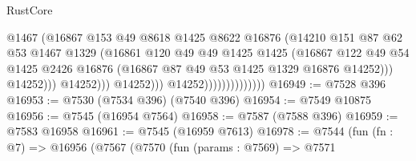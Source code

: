 \begin{lexlean}{RustCore}
\begin{coremodule}
                                              @1467
                                              (@16867
                                                @153
                                                @49
                                                @8618
                                                @1425
                                                @8622
                                                @16876
                                                (@14210
                                                  @151
                                                  @87
                                                  @62
                                                  @53
                                                  @1467
                                                  @1329
                                                  (@16861
                                                    @120
                                                    @49
                                                    @49
                                                    @1425
                                                    @1425
                                                    (@16867
                                                      @122
                                                      @49
                                                      @54
                                                      @1425
                                                      @2426
                                                      @16876
                                                      (@16867
                                                        @87
                                                        @49
                                                        @53
                                                        @1425
                                                        @1329
                                                        @16876
                                                        @14252)))
                                                  @14252)))
                                            @14252)))
                                      @14252)))
                                @14252))))))))))))))
@16949 := @7528 @396
@16953 := @7530 (@7534 @396) (@7540 @396)
@16954 := @7549 @10875
@16956 := @7545 (@16954 @7564)
@16958 := @7587 (@7588 @396)
@16959 := @7583 @16958
@16961 := @7545 (@16959 @7613)
@16978 := @7544
    (fun (fn : @7) =>
    @16956
      (@7567
        (@7570
          (fun (params : @7569) =>
          @7571

\end{coremodule}
\end{lexlean}
